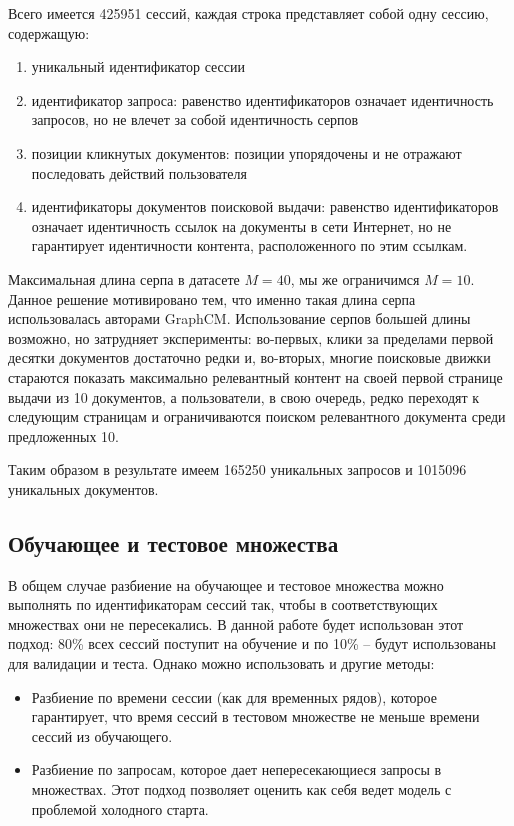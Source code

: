 \documentclass[diploma]{nanolab2015}
\begin{document}
Всего имеется 425951 сессий, каждая строка представляет собой одну сессию, содержащую:

\begin{enumerate}
  \item уникальный идентификатор сессии
  \item идентификатор запроса: равенство идентификаторов означает идентичность запросов, но не влечет за собой идентичность серпов
  \item позиции кликнутых документов: позиции упорядочены и не отражают последовать действий пользователя
  \item идентификаторы документов поисковой выдачи: равенство идентификаторов означает идентичность ссылок на документы в сети Интернет, но не гарантирует идентичности контента, расположенного по этим ссылкам.
\end{enumerate}

Максимальная длина серпа в датасете $M = 40$, мы же ограничимся $M = 10$. Данное решение мотивировано тем, что именно такая длина серпа использовалась авторами GraphCM. Использование серпов большей длины возможно, но затрудняет эксперименты: во-первых, клики за пределами первой десятки документов достаточно редки и, во-вторых, многие поисковые движки стараются показать максимально релевантный контент на своей первой странице выдачи из 10 документов, а пользователи, в свою очередь, редко переходят к следующим страницам и ограничиваются поиском релевантного документа среди предложенных 10.

Таким образом в результате имеем 165250 уникальных запросов и 1015096 уникальных документов.

\subsection{Обучающее и тестовое множества}
В общем случае разбиение на обучающее и тестовое множества можно выполнять по идентификаторам сессий так, чтобы в соответствующих множествах они не пересекались. В данной работе будет использован этот подход: 80\% всех сессий поступит на обучение и по 10\% -- будут использованы для валидации и теста. Однако можно использовать и другие методы:
\begin{itemize}
  \item Разбиение по времени сессии (как для временных рядов), которое гарантирует, что время сессий в тестовом множестве не меньше времени сессий из обучающего.
  \item Разбиение по запросам, которое дает непересекающиеся запросы в множествах. Этот подход позволяет оценить как себя ведет модель с проблемой холодного старта.
\end{itemize}
\end{document}

